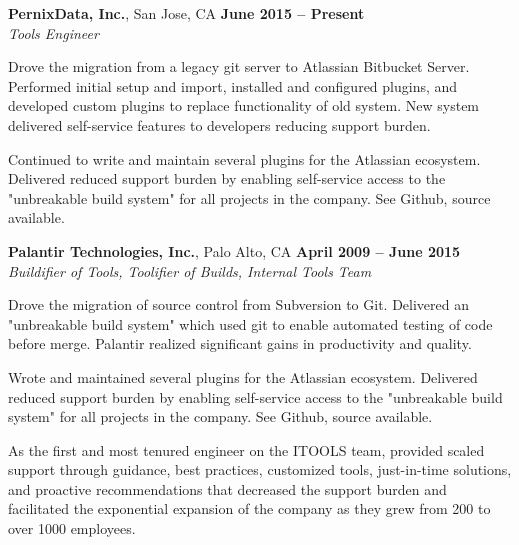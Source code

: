 \documentclass[margin,line]{resume}
\begin{document}
\begin{resume}
	{\bf PernixData, Inc.}, San Jose, CA   \hfill {\bf June 2015 -- Present}
	\vspace{1mm} \\ \vspace{1mm}
	{\sl Tools Engineer}
	\begin{list2}
		\vspace*{1mm}
	\item
        Drove the migration from a legacy git server to Atlassian Bitbucket
        Server.  Performed initial setup and import, installed and configured
        plugins, and developed custom plugins to replace functionality of old
        system.  New system delivered self-service features to developers
        reducing support burden.
	\item
        Continued to write and maintain several plugins for the Atlassian
        ecosystem.  Delivered reduced support burden by enabling self-service
        access to the "unbreakable build system" for all projects in the
        company.  See Github, source available.
	\end{list2}
	{\bf Palantir Technologies, Inc.}, Palo Alto, CA   \hfill {\bf April 2009 -- June 2015}
	\vspace{1mm} \\ \vspace{1mm}
	{\sl Buildifier of Tools, Toolifier of Builds, Internal Tools Team} %
	\begin{list2}
		\vspace*{1mm}
	\item
		Drove the migration of source control from Subversion to Git.
		Delivered an "unbreakable build system" which used git to enable
		automated testing of code before merge.  Palantir realized significant
		gains in productivity and quality.
	\item
		Wrote and maintained several plugins for the Atlassian ecosystem.
		Delivered reduced support burden by enabling self-service access to
		the "unbreakable build system" for all projects in the company.  See
		Github, source available.
	\item
		As the first and most tenured engineer on the ITOOLS team, provided
		scaled support through guidance, best practices, customized tools,
		just-in-time solutions, and proactive recommendations that decreased
		the support burden and facilitated the exponential expansion of the
		company as they grew from 200 to over 1000 employees.
	\item

\end{list2}
\end{resume}
\end{document}
